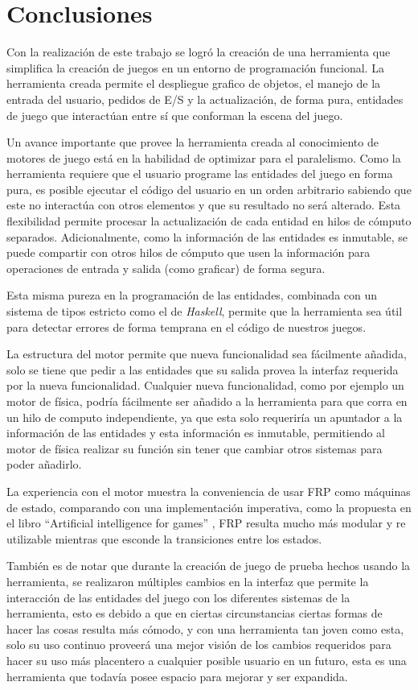 
\chapter{Conclusiones}
\label{capitulo6}

Con la realización de este trabajo se logró la creación de una herramienta que simplifica la creación de juegos en un entorno de programación funcional. La herramienta creada permite el despliegue grafico de objetos, el manejo de la entrada del usuario, pedidos de E/S y la actualización, de forma pura, entidades de juego que interactúan entre sí que conforman la escena del juego.

Un avance importante que provee la herramienta creada al conocimiento de motores de juego está en la habilidad de optimizar para el paralelismo. Como la herramienta requiere que el usuario programe las entidades del juego en forma pura, es posible ejecutar el código del usuario en un orden arbitrario sabiendo que este no interactúa con otros elementos y que su resultado no será alterado. Esta flexibilidad permite procesar la actualización de cada entidad en hilos de cómputo separados. Adicionalmente, como la información de las entidades es inmutable, se puede compartir con otros hilos de cómputo que usen la información para operaciones de entrada y salida (como graficar) de forma segura.

Esta misma pureza en la programación de las entidades, combinada con un sistema de tipos estricto como el de \emph{Haskell}, permite que la herramienta sea útil para detectar errores de forma temprana en el código de nuestros juegos.

La estructura del motor permite que nueva funcionalidad  sea fácilmente añadida, solo se tiene que pedir a las entidades que su salida provea la interfaz requerida por la nueva funcionalidad. Cualquier nueva funcionalidad, como por ejemplo un motor de física, podría fácilmente ser añadido a la herramienta para que corra en un hilo de computo independiente, ya que esta solo requeriría un apuntador a la información de las entidades y esta información es inmutable, permitiendo al motor de física realizar su función sin tener que cambiar otros sistemas para poder añadirlo.

La experiencia con el motor muestra la conveniencia de usar FRP como máquinas de estado, comparando con una implementación imperativa, como la propuesta en el libro “Artificial intelligence for games” \cite{millington2016artificial}, FRP resulta mucho más modular y re utilizable mientras que esconde la transiciones entre los estados.

También es de notar que durante la creación de juego de prueba hechos usando la herramienta, se realizaron múltiples cambios en la interfaz que permite la interacción de las entidades del juego con los diferentes sistemas de la herramienta, esto es debido a que en ciertas circunstancias ciertas formas de hacer las cosas resulta más cómodo, y con una herramienta tan joven como esta, solo su uso continuo proveerá una mejor visión de los cambios requeridos para hacer su uso más placentero a cualquier posible usuario en un futuro, esta es una herramienta que todavía posee espacio para mejorar y ser expandida.
